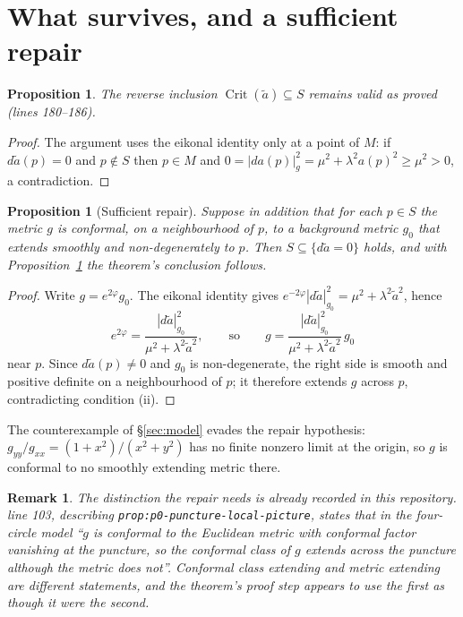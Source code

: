 \documentclass[11pt]{article}
\newtheorem{proposition}[theorem]{Proposition}
\newtheorem{remark}[theorem]{Remark}
\begin{document}
\section{What survives, and a sufficient repair}
\label{sec:repair}

\begin{proposition}
\label{prop:reverse}
The reverse inclusion $\operatorname{Crit}(\widetilde a)\subseteq S$ remains
valid as proved (lines 180--186).
\end{proposition}

\begin{proof}
The argument uses the eikonal identity only at a point of $M$: if
$d\widetilde a(p)=0$ and $p\notin S$ then $p\in M$ and
$0=|da(p)|_g^2=\mu^2+\lambda^2a(p)^2\ge\mu^2>0$, a contradiction.
\end{proof}

\begin{proposition}[Sufficient repair]
\label{prop:repair}
Suppose in addition that for each $p\in S$ the metric $g$ is conformal, on a
neighbourhood of $p$, to a background metric $g_0$ that extends smoothly and
non-degenerately to $p$. Then $S\subseteq\{d\widetilde a=0\}$ holds, and with
Proposition~\ref{prop:reverse} the theorem's conclusion follows.
\end{proposition}

\begin{proof}
Write $g=e^{2\varphi}g_0$. The eikonal identity gives
$e^{-2\varphi}|d\widetilde a|_{g_0}^2=\mu^2+\lambda^2\widetilde a^2$, hence
\[
e^{2\varphi}=\frac{|d\widetilde a|_{g_0}^2}{\mu^2+\lambda^2\widetilde a^2},
\qquad\text{so}\qquad
g=\frac{|d\widetilde a|_{g_0}^2}{\mu^2+\lambda^2\widetilde a^2}\,g_0
\]
near $p$. Since $d\widetilde a(p)\ne0$ and $g_0$ is non-degenerate, the right
side is smooth and positive definite on a neighbourhood of $p$; it therefore
extends $g$ across $p$, contradicting condition (ii).
\end{proof}

The counterexample of \S\ref{sec:model} evades the repair hypothesis:
$g_{yy}/g_{xx}=(1+x^2)/(x^2+y^2)$ has no finite nonzero limit at the origin, so
$g$ is conformal to no smoothly extending metric there.

\begin{remark}
The distinction the repair needs is already recorded in this repository.
 line 103, describing
\texttt{prop:p0-puncture-local-picture}, states that in the four-circle model
``$g$ is conformal to the Euclidean metric with conformal factor vanishing at the
puncture, so the \emph{conformal class} of $g$ extends across the puncture
although the metric does not''. Conformal class extending and metric extending
are different statements, and the theorem's proof step appears to use the first
as though it were the second.
\end{remark}
\end{document}
